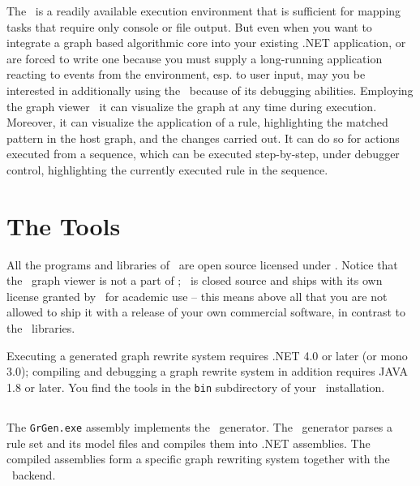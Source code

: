 The \GrShell\ is a readily available execution environment that is sufficient for mapping tasks that require only console or file output.
But even when you want to integrate a graph based algorithmic core into your existing .NET application, 
or are forced to write one because you must supply a long-running application reacting to events from the environment, esp. to user input,
may you be interested in additionally using the \GrShell\ because of its debugging abilities.
Employing the graph viewer \yComp\ it can visualize the graph at any time during execution.
Moreover, it can visualize the application of a rule, highlighting the matched pattern in the host graph, and the changes carried out.
It can do so for actions executed from a sequence, which can be executed step-by-step, under debugger control, highlighting the currently executed rule in the sequence.

\section{The Tools}

All the programs and libraries of \GrG\ are open source licensed under .
Notice that the \yComp\ graph viewer is not a part of \GrG ; \yComp\ is closed source and ships with its own license granted by \yFiles\ for academic use --
this means above all that you are not allowed to ship it with a release of your own commercial software, in contrast to the \GrG\ libraries.

Executing a generated graph rewrite system requires .NET 4.0 or later (or mono 3.0); compiling and debugging a graph rewrite system in addition requires JAVA 1.8 or later. 
You find the tools in the \texttt{bin} subdirectory of your \GrG\ installation.

\subsection{\texttt{}} \label{grgenoptions}

\noindent The \texttt{GrGen.exe} assembly implements the \GrG\ generator.
The \GrG\ generator parses a rule set and its model files and compiles them into .NET assemblies.
The compiled assemblies form a specific graph rewriting system together with the \GrG\ backend.

